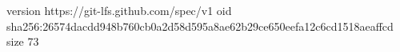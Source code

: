 version https://git-lfs.github.com/spec/v1
oid sha256:26574dacdd948b760cb0a2d58d595a8ae62b29ce650eefa12c6cd1518aeaffcd
size 73
